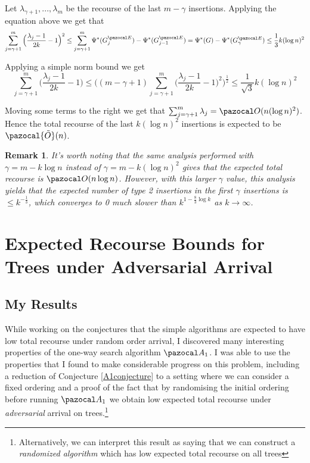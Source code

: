 \documentclass{report}
\newtheorem{remark}[theorem]{Remark}
\begin{document}
Let $\lambda_{\gamma+1},...,\lambda_{m}$ be the recourse of the last $m - \gamma$ insertions. Applying the equation above we get that
\[\sum_{j=\gamma+1}^{m}\Big (\frac{\lambda_j - 1}{2k} - 1 \Big )^2 \leq \sum_{j=\gamma+1}^m \Psi^*(G^{\pazocal E}_j) - \Psi^*(G^{\pazocal E}_{j-1}) = \Psi^*(G) - \Psi^*(G^{\pazocal E}_{\gamma}) \leq \frac{1}{3}k(\log n)^2 \]

Applying a simple norm bound we get
\[\sum_{j=\gamma+1}^{m}\Big (\frac{\lambda_j - 1}{2k} - 1 \Big ) \leq \bigg((m-\gamma+1) \sum_{j=\gamma+1}^{m}\Big (\frac{\lambda_j - 1}{2k} - 1 \Big )^2 \bigg ) ^{\frac{1}{2}} \leq \frac{1}{\sqrt 3} k (\log n)^2\]

Moving some terms to the right we get that $\sum_{j=\gamma+1}^{m}\lambda_{j} = \pazocal O (n (\log n)^2)$. Hence the total recourse of the last $k(\log n)^2$ insertions is expected to be $\pazocal{\tilde{O}}(n)$.

\begin{remark}
It's worth noting that the same analysis performed with $\gamma = m - k \log n$ instead of $\gamma = m - k (\log n)^2$ gives that the expected total recourse is $\pazocal O (n \log n)$. However, with this larger $\gamma$ value, this analysis yields that the expected number of type 2 insertions in the first $\gamma$ insertions is $\leq k^{-\frac{1}{3}}$, which converges to 0 \textit{much} slower than $k^{1-\frac{8}{3}\log k}$ as $k \rightarrow \infty$.
\end{remark}

\chapter{Expected Recourse Bounds for Trees under Adversarial Arrival}\label{chapter6}

\section{My Results}

While working on the conjectures that the simple algorithms are expected to have low total recourse under random order arrival, I discovered many interesting properties of the one-way search algorithm $\pazocal A_1$. I was able to use the properties that I found to make considerable progress on this problem, including a reduction of Conjecture \ref{A1conjecture} to a setting where we can consider a fixed ordering and a proof of the fact that by randomising the initial ordering before running $\pazocal A_1$ we obtain low expected total recourse under \textit{adversarial} arrival on trees.\footnote{Alternatively, we can interpret this result as saying that we can construct a \textit{randomized algorithm} which has low expected total recourse on all trees}
\end{document}
